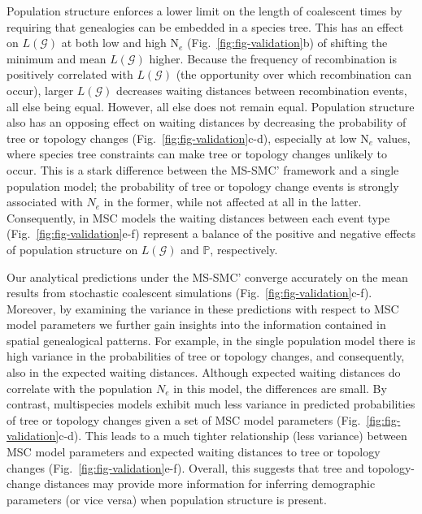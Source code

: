 \documentclass[11pt]{article}
\begin{document}
Population structure enforces a lower limit on the length of coalescent 
times by requiring that genealogies can be embedded in a species tree.
This has an effect on $L(\mathcal{G})$ at both low and high N$_e$
(Fig.~\ref{fig:fig-validation}b) of shifting the minimum and mean 
$L(\mathcal{G})$ higher. Because the frequency of recombination is 
positively correlated with $L(\mathcal{G})$ (the opportunity over 
which recombination can occur), larger $L(\mathcal{G})$ decreases 
waiting distances between recombination events, all else being equal. 
However, all else does not remain equal. 
Population structure also has an opposing effect on waiting distances by 
decreasing the probability of tree or topology changes 
(Fig.~\ref{fig:fig-validation}c-d), especially at low N$_e$ values, where 
species tree constraints can make tree or topology changes unlikely
to occur. This is a stark difference between the MS-SMC' framework and a 
single population model; the probability of tree or topology change 
events is strongly associated with $N_e$ in the former, while not affected 
at all in the latter. Consequently, in MSC models the waiting distances 
between each event type (Fig.~\ref{fig:fig-validation}e-f) represent a balance 
of the positive and negative effects of population structure on 
$L(\mathcal{G})$ and $\mathbb{P}$, respectively.

Our analytical predictions under the MS-SMC' converge accurately on 
the mean results from stochastic coalescent simulations 
(Fig.~\ref{fig:fig-validation}c-f). 
Moreover, by examining the variance in these predictions with 
respect to MSC model parameters we further gain insights into 
the information contained in spatial genealogical patterns.
For example, in the single population model there is high variance 
in the probabilities of tree or topology changes, and consequently, 
also in the expected waiting distances. Although expected waiting 
distances do correlate with the population $N_e$ in this model, 
the differences are small. By contrast, multispecies models exhibit much less
variance in predicted probabilities of tree or topology changes given a set of
MSC model parameters (Fig.~\ref{fig:fig-validation}c-d). This leads to a 
much tighter relationship (less variance) between MSC model parameters and 
expected waiting distances to tree or topology changes (Fig.~\ref{fig:fig-validation}e-f). 
Overall, this suggests that tree and topology-change distances may provide
more information for inferring demographic parameters (or vice versa) 
when population structure is present. 
\end{document}
